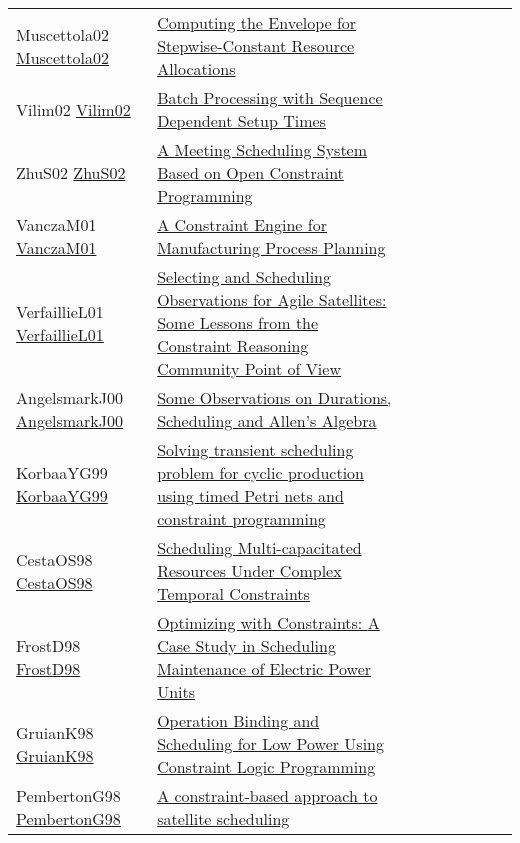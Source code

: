 {\begin{longtable}{p{3cm}p{7cm}lllllll}
Muscettola02 \href{https://doi.org/10.1007/3-540-46135-3\_10}{Muscettola02} &  \href{papers/Muscettola02.pdf}{Computing the Envelope for Stepwise-Constant Resource Allocations} &  &  &  &  &  &  & \\
Vilim02 \href{https://doi.org/10.1007/3-540-46135-3\_62}{Vilim02} &  \href{papers/Vilim02.pdf}{Batch Processing with Sequence Dependent Setup Times} &  &  &  &  &  &  & \\
ZhuS02 \href{https://doi.org/10.1007/3-540-47961-9\_69}{ZhuS02} &  \href{papers/ZhuS02.pdf}{A Meeting Scheduling System Based on Open Constraint Programming} &  &  &  &  &  &  & \\
VanczaM01 \href{https://doi.org/10.1007/3-540-45578-7\_60}{VanczaM01} &  \href{papers/VanczaM01.pdf}{A Constraint Engine for Manufacturing Process Planning} &  &  &  &  &  &  & \\
VerfaillieL01 \href{https://doi.org/10.1007/3-540-45578-7\_55}{VerfaillieL01} &  \href{papers/VerfaillieL01.pdf}{Selecting and Scheduling Observations for Agile Satellites: Some Lessons from the Constraint Reasoning Community Point of View} &  &  &  &  &  &  & \\
AngelsmarkJ00 \href{https://doi.org/10.1007/3-540-45349-0\_35}{AngelsmarkJ00} &  \href{papers/AngelsmarkJ00.pdf}{Some Observations on Durations, Scheduling and Allen's Algebra} &  &  &  &  &  &  & \\
KorbaaYG99 \href{https://doi.org/10.23919/ECC.1999.7099947}{KorbaaYG99} &  \href{papers/KorbaaYG99.pdf}{Solving transient scheduling problem for cyclic production using timed Petri nets and constraint programming} &  &  &  &  &  &  & \\
CestaOS98 \href{https://doi.org/10.1007/3-540-49481-2\_36}{CestaOS98} &  \href{papers/CestaOS98.pdf}{Scheduling Multi-capacitated Resources Under Complex Temporal Constraints} &  &  &  &  &  &  & \\
FrostD98 \href{https://doi.org/10.1007/3-540-49481-2\_40}{FrostD98} &  \href{papers/FrostD98.pdf}{Optimizing with Constraints: {A} Case Study in Scheduling Maintenance of Electric Power Units} &  &  &  &  &  &  & \\
GruianK98 \href{https://doi.org/10.1109/EURMIC.1998.711781}{GruianK98} &  \href{papers/GruianK98.pdf}{Operation Binding and Scheduling for Low Power Using Constraint Logic Programming} &  &  &  &  &  &  & \\
PembertonG98 \href{https://doi.org/10.1090/dimacs/057/06}{PembertonG98} &  \href{papers/PembertonG98.pdf}{A constraint-based approach to satellite scheduling} &  &  &  &  &  &  & \\

\end{longtable}}
